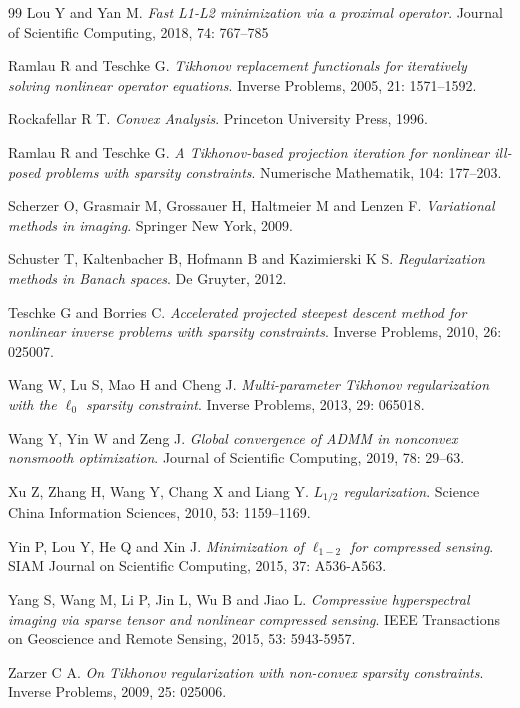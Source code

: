 \documentclass[a4paper,12pt]{article}
\numberwithin{equation}{section}
\begin{document}
\begin{thebibliography}{99}
Lou Y and Yan M. \emph{Fast L1-L2 minimization via a proximal operator}. Journal of Scientific Computing, 2018, 74: 767--785

Ramlau R and Teschke G. \emph{Tikhonov replacement functionals for iteratively solving nonlinear operator equations}. Inverse Problems, 2005, 21: 1571--1592.

Rockafellar R T. \emph{Convex Analysis}. Princeton University Press, 1996.


Ramlau R and Teschke G. \emph{A Tikhonov-based projection iteration for nonlinear ill-posed problems with sparsity constraints}. Numerische Mathematik, 104: 177--203.

Scherzer O, Grasmair M, Grossauer H, Haltmeier M and Lenzen F. \emph{Variational methods in imaging}. Springer New York, 2009.

Schuster T, Kaltenbacher B, Hofmann B and Kazimierski K S. \emph{Regularization methods in Banach spaces}. De Gruyter, 2012. 

Teschke G and Borries C. \emph{Accelerated projected steepest descent method for nonlinear inverse problems with sparsity constraints}. Inverse Problems, 2010, 26: 025007.

Wang W, Lu S, Mao H and Cheng J. \emph{Multi-parameter Tikhonov regularization with the $\ell_{0}$ sparsity constraint}. Inverse Problems, 2013, 29: 065018.

Wang Y, Yin W and Zeng J. \emph{Global convergence of ADMM in nonconvex nonsmooth optimization}. Journal of Scientific Computing, 2019, 78: 29--63.

Xu Z, Zhang H, Wang Y, Chang X and Liang Y. \emph{$L_{1/2}$ regularization}. Science China Information Sciences, 2010, 53: 1159--1169.

Yin P, Lou Y, He Q and Xin J. \emph{Minimization of $\ell_{1-2}$ for compressed sensing}. SIAM Journal on Scientific Computing, 2015, 37: A536-A563.

Yang S, Wang M, Li P, Jin L, Wu B and Jiao L. \emph{Compressive hyperspectral imaging via sparse tensor and nonlinear compressed sensing}. IEEE Transactions on Geoscience and Remote Sensing, 2015, 53: 5943-5957.

Zarzer C A. \emph{On Tikhonov regularization with non-convex sparsity constraints}. Inverse Problems, 2009, 25: 025006.

\end{thebibliography}
\end{document}
